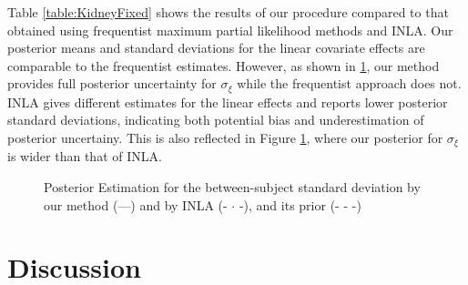 \documentclass[]{article}
\begin{document}
Table \ref{table:KidneyFixed} shows the results of our procedure compared to that obtained using frequentist maximum partial likelihood methods and INLA. Our posterior means and standard deviations for the linear covariate effects are comparable to the frequentist estimates. However, as shown in \ref{fig:BetweenSubjectSD}, our method provides full posterior uncertainty for $\sigma_{\xi}$ while the frequentist approach does not. INLA gives different estimates for the linear effects and reports lower posterior standard deviations, indicating both potential bias and underestimation of posterior uncertainy. This is also reflected in Figure \ref{fig:BetweenSubjectSD}, where our posterior for $\sigma_{\xi}$ is wider than that of INLA.

\begin{figure}[ht]
\centering
{}
\caption{Posterior Estimation for the between-subject standard deviation by our method (---) and by INLA (- $\cdot$ -), and its prior (- - -)}
\label{fig:BetweenSubjectSD}
\end{figure}

\section{Discussion}\label{sec:discussion}
\end{document}

